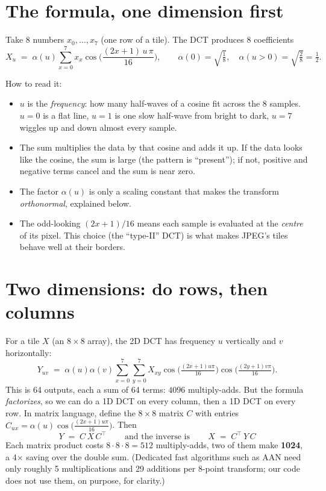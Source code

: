\section{The formula, one dimension first}

Take 8 numbers $x_0,\dots,x_7$ (one row of a tile). The DCT produces 8 coefficients
\begin{equation}
X_u \;=\; \alpha(u)\sum_{x=0}^{7} x_x \cos\!\Big(\frac{(2x+1)\,u\,\pi}{16}\Big),\qquad
\alpha(0)=\sqrt{\tfrac18},\quad \alpha(u>0)=\sqrt{\tfrac28}=\tfrac12 .
\end{equation}

How to read it:
\begin{itemize}
\item $u$ is the \emph{frequency}: how many half-waves of a cosine fit across the 8 samples. $u=0$ is a flat line, $u=1$ is one slow half-wave from bright to dark, $u=7$ wiggles up and down almost every sample.
\item The sum multiplies the data by that cosine and adds it up. If the data looks like the cosine, the sum is large (the pattern is ``present''); if not, positive and negative terms cancel and the sum is near zero.
\item The factor $\alpha(u)$ is only a scaling constant that makes the transform \emph{orthonormal}, explained below.
\item The odd-looking $(2x+1)/16$ means each sample is evaluated at the \emph{centre} of its pixel. This choice (the ``type-II'' DCT) is what makes JPEG's tiles behave well at their borders.
\end{itemize}

\section{Two dimensions: do rows, then columns}

For a tile $X$ (an $8\times8$ array), the 2D DCT has frequency $u$ vertically and $v$ horizontally:
\begin{equation}
Y_{uv} \;=\; \alpha(u)\alpha(v)\sum_{x=0}^{7}\sum_{y=0}^{7} X_{xy}\cos\!\Big(\tfrac{(2x+1)u\pi}{16}\Big)\cos\!\Big(\tfrac{(2y+1)v\pi}{16}\Big).
\end{equation}
This is 64 outputs, each a sum of 64 terms: $4096$ multiply-adds. But the formula \emph{factorizes}, so we can do a 1D DCT on every column, then a 1D DCT on every row. In matrix language, define the $8\times8$ matrix $C$ with entries $C_{ux}=\alpha(u)\cos\big(\tfrac{(2x+1)u\pi}{16}\big)$. Then
\begin{equation}
\boxed{\,Y \;=\; C\,X\,C^{\!\top}\,}\qquad\text{and the inverse is}\qquad \boxed{\,X \;=\; C^{\!\top}\,Y\,C\,}
\end{equation}
Each matrix product costs $8\cdot8\cdot8=512$ multiply-adds, two of them make \textbf{1024}, a 4$\times$ saving over the double sum. (Dedicated fast algorithms such as AAN need only roughly 5 multiplications and 29 additions per 8-point transform; our code does not use them, on purpose, for clarity.)

